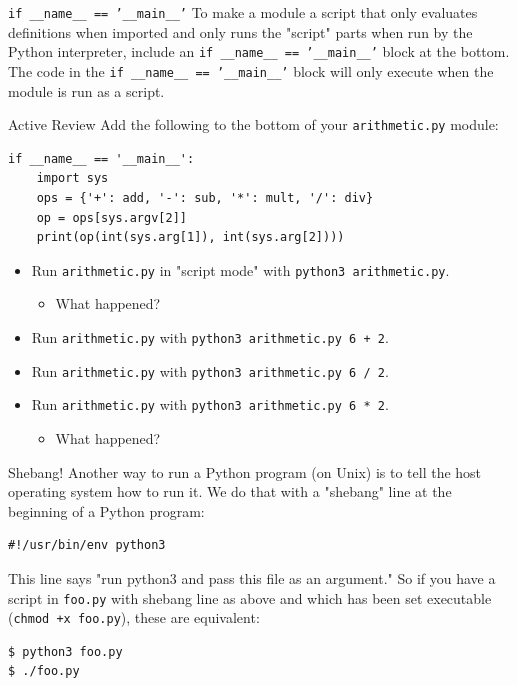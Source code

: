 \documentclass[smaller, aspectratio=1610]{beamer}
\begin{document}
\begin{frame}[label={sec:org4a67a63},fragile]{\texttt{if \_\_name\_\_ == '\_\_main\_\_'}}
 To make a module a script that only evaluates definitions when imported and only runs the "script" parts when run by the Python interpreter, include an \texttt{if \_\_name\_\_ == '\_\_main\_\_'} block at the bottom.  The code in the \texttt{if \_\_name\_\_ == '\_\_main\_\_'} block will only execute when the module is run as a script.

\begin{block}{Active Review}
Add the following to the bottom of your \texttt{arithmetic.py} module:

\lstset{language=Python,label= ,caption= ,captionpos=b,numbers=none}
\begin{lstlisting}
if __name__ == '__main__':
    import sys
    ops = {'+': add, '-': sub, '*': mult, '/': div}
    op = ops[sys.argv[2]]
    print(op(int(sys.arg[1]), int(sys.arg[2])))
\end{lstlisting}

\begin{itemize}
\item Run \texttt{arithmetic.py} in "script mode" with \texttt{python3 arithmetic.py}.
\begin{itemize}
\item What happened?
\end{itemize}
\item Run \texttt{arithmetic.py} with \texttt{python3 arithmetic.py 6 + 2}.
\item Run \texttt{arithmetic.py} with \texttt{python3 arithmetic.py 6 / 2}.
\item Run \texttt{arithmetic.py} with \texttt{python3 arithmetic.py 6 * 2}.
\begin{itemize}
\item What happened?
\end{itemize}
\end{itemize}
\end{block}
\end{frame}

\begin{frame}[label={sec:orgc324f2b},fragile]{Shebang!}
 Another way to run a Python program (on Unix) is to tell the host operating system how to run it. We do that with a "shebang" line at the beginning of a Python program:

\lstset{language=Python,label= ,caption= ,captionpos=b,numbers=none}
\begin{lstlisting}
#!/usr/bin/env python3
\end{lstlisting}

This line says "run python3 and pass this file as an argument." So if you have a script in \texttt{foo.py} with shebang line as above and which has been set executable (\texttt{chmod +x foo.py}), these are equivalent:

\lstset{language=Python,label= ,caption= ,captionpos=b,numbers=none}
\begin{lstlisting}
$ python3 foo.py
$ ./foo.py
\end{lstlisting}
\end{frame}
\end{document}
